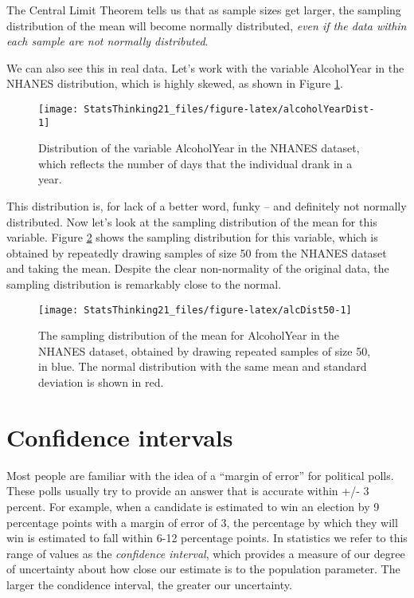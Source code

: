 \documentclass[]{book}
\theoremstyle{definition}
\theoremstyle{definition}
\theoremstyle{definition}
\theoremstyle{remark}
\begin{document}
The Central Limit Theorem tells us that as sample sizes get larger, the
sampling distribution of the mean will become normally distributed,
\emph{even if the data within each sample are not normally distributed}.

We can also see this in real data. Let's work with the variable
AlcoholYear in the NHANES distribution, which is highly skewed, as shown
in Figure \ref{fig:alcoholYearDist}.

\begin{figure}
\texttt{[image: StatsThinking21\_files/figure-latex/alcoholYearDist-1]} \caption{Distribution of the variable AlcoholYear in the NHANES dataset, which reflects the number of days that the individual drank in a year.}\label{fig:alcoholYearDist}
\end{figure}

This distribution is, for lack of a better word, funky -- and definitely
not normally distributed. Now let's look at the sampling distribution of
the mean for this variable. Figure \ref{fig:alcDist50} shows the
sampling distribution for this variable, which is obtained by repeatedly
drawing samples of size 50 from the NHANES dataset and taking the mean.
Despite the clear non-normality of the original data, the sampling
distribution is remarkably close to the normal.

\begin{figure}
\texttt{[image: StatsThinking21\_files/figure-latex/alcDist50-1]} \caption{The sampling distribution of the mean for AlcoholYear in the NHANES dataset, obtained by drawing repeated samples of size 50, in blue.  The normal distribution with the same mean and standard deviation is shown in red.}\label{fig:alcDist50}
\end{figure}

\section{Confidence intervals}\label{confidence-intervals}

Most people are familiar with the idea of a ``margin of error'' for
political polls. These polls usually try to provide an answer that is
accurate within +/- 3 percent. For example, when a candidate is
estimated to win an election by 9 percentage points with a margin of
error of 3, the percentage by which they will win is estimated to fall
within 6-12 percentage points. In statistics we refer to this range of
values as the \emph{confidence interval}, which provides a measure of
our degree of uncertainty about how close our estimate is to the
population parameter. The larger the condidence interval, the greater
our uncertainty.
\end{document}
